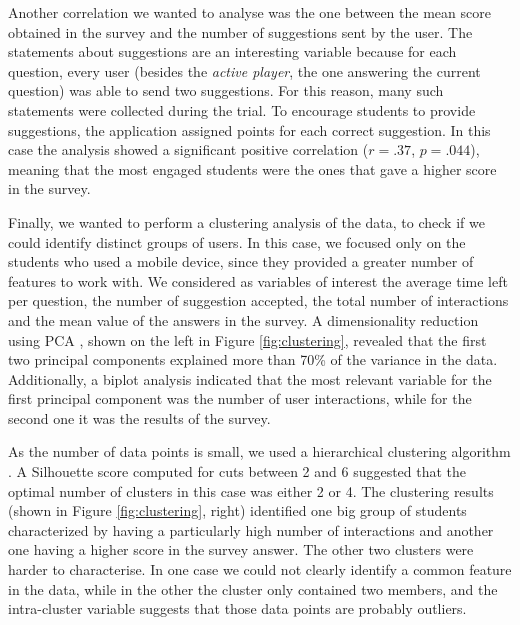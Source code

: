 \documentclass[pdflatex,sn-basic,iicol]{sn-jnl}%
\begin{document}
Another correlation we wanted to analyse was the one between the mean score obtained in the survey and the number of suggestions sent by the user. The statements about suggestions are an interesting variable because for each question, every user (besides the \textit{active player}, the one answering the current question) was able to send two suggestions. For this reason, many such statements were collected during the trial. To encourage students to provide suggestions, the application assigned points for each correct suggestion. In this case the analysis showed a significant positive correlation ($r = .37$, $p = .044$), meaning that the most engaged students were the ones that gave a higher score in the survey.

Finally, we wanted to perform a clustering analysis of the data, to check if we could identify distinct groups of users. In this case, we focused only on the students who used a mobile device, since they provided a greater number of features to work with. We considered as variables of interest the average time left per question, the number of suggestion accepted, the total number of interactions and the mean value of the answers in the survey.
A dimensionality reduction using PCA \citep{jolliffe2002principal}, shown on the left in Figure \ref{fig:clustering}, revealed that the first two principal components explained more than 70\% of the variance in the data. Additionally, a biplot analysis indicated that the most relevant variable for the first principal component was the number of user interactions, while for the second one it was the results of the survey.

As the number of data points is small, we used a hierarchical clustering algorithm \citep{hiera}. A Silhouette score \citep{ROUSSEEUW198753} computed for cuts between 2 and 6 suggested that the optimal number of clusters in this case was either 2 or 4. The clustering results (shown in Figure \ref{fig:clustering}, right) identified one big group of students characterized by having a particularly high number of interactions and another one having a higher score in the survey answer. The other two clusters were harder to characterise. In one case we could not clearly identify a common feature in the data, while in the other the cluster only contained two members, and the intra-cluster variable suggests that those data points are probably outliers.
\end{document}
